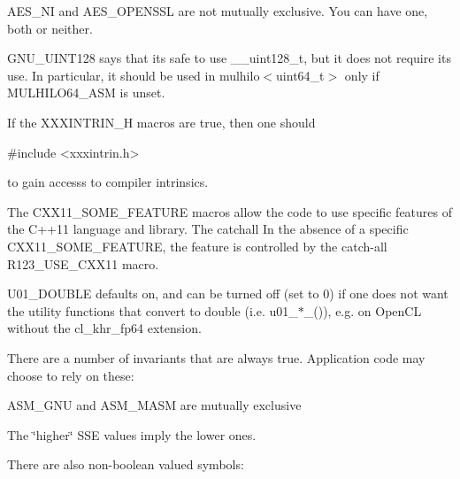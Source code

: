 A\+E\+S\+\_\+\+NI and A\+E\+S\+\_\+\+O\+P\+E\+N\+S\+SL are not mutually exclusive. You can have one, both or neither.

G\+N\+U\+\_\+\+U\+I\+N\+T128 says that it\textquotesingle{}s safe to use \+\_\+\+\_\+uint128\+\_\+t, but it does not require its use. In particular, it should be used in mulhilo$<$uint64\+\_\+t$>$ only if M\+U\+L\+H\+I\+L\+O64\+\_\+\+A\+SM is unset.

If the X\+X\+X\+I\+N\+T\+R\+I\+N\+\_\+H macros are true, then one should 
\begin{DoxyCode}
\textcolor{preprocessor}{#include <xxxintrin.h>}
\end{DoxyCode}
 to gain accesss to compiler intrinsics.

The C\+X\+X11\+\_\+\+S\+O\+M\+E\+\_\+\+F\+E\+A\+T\+U\+RE macros allow the code to use specific features of the C++11 language and library. The catchall In the absence of a specific C\+X\+X11\+\_\+\+S\+O\+M\+E\+\_\+\+F\+E\+A\+T\+U\+RE, the feature is controlled by the catch-\/all R123\+\_\+\+U\+S\+E\+\_\+\+C\+X\+X11 macro.

U01\+\_\+\+D\+O\+U\+B\+LE defaults on, and can be turned off (set to 0) if one does not want the utility functions that convert to double (i.\+e. u01\+\_\+$\ast$\+\_()), e.\+g. on Open\+CL without the cl\+\_\+khr\+\_\+fp64 extension.

There are a number of invariants that are always true. Application code may choose to rely on these\+:


\begin{DoxyItemize}
\item A\+S\+M\+\_\+\+G\+NU and A\+S\+M\+\_\+\+M\+A\+SM are mutually exclusive 
\item The \char`\"{}higher\char`\"{} S\+SE values imply the lower ones. 
\end{DoxyItemize}

There are also non-\/boolean valued symbols\+:


